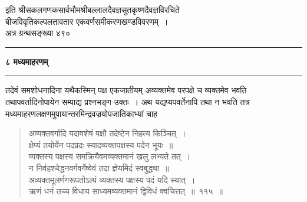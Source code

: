 \documentclass[11pt, openany]{book}
\begin{document}
 \begin{center}
     इति श्रीसकलगणकसार्वभौमश्रीबल्लालदैवज्ञसुतकृष्णदैवज्ञविरचिते \\
 बीजविवृतिकल्पलतावतार एकवर्णसमीकरणखण्डविवरणम्~। \\
 अत्र ग्रन्थसङ्ख्या ४९०\\
\vspace{1.5cm}
\rule{0.2\linewidth}{0.5pt}
 \end{center}
 

\newpage

 \label{ch8}
\begin{center}
    {\LARGE \textbf{८ मध्यमाहरणम्}}\\
    \rule{0.2\linewidth}{0.9pt}
\end{center}

 तदेवं समशोधनादिना यथैकस्मिन् पक्ष एकजातीयम् अव्यक्तमेव परपक्षे च व्यक्तमेव
भवति तथापवर्तादिनोपायेन सम्पाद्य प्रश्नभङ्ग उक्तः~। अथ यद्यप्यपवर्तेनापि
तथा न भवति तत्र मध्यमाहरणलक्षणमुपायान्तरमिन्द्रवज्रयोपजातिकाभ्यां चाह\textendash 

 \label{115}
\begin{quote}
    \ab 
     अव्यक्तवर्गादि यदावशेषं पक्षौ तदेष्टेन निहत्य किञ्चित्~। \\
 क्षेप्यं तयोर्येन पदप्रदः स्यादव्यक्तपक्षस्य पदेन भूयः~॥~\\
 व्यक्तस्य पक्षस्य समक्रियैवमव्यक्तमानं खलु लभ्यते तत्~। \\
 न निर्वहश्चेद्धनवर्गवर्गेष्वेवं तदा ज्ञेयमिदं स्वबुद्ध्या~॥~\\
 अव्यक्तमूलर्णगरूपतोऽल्पं व्यक्तस्य पक्षस्य पदं यदि स्यात्~। \\
 ऋणं धनं तच्च विधाय साध्यमव्यक्तमानं द्विविधं क्वचित्तत्~॥~११५~॥
\end{quote}
\end{document}

